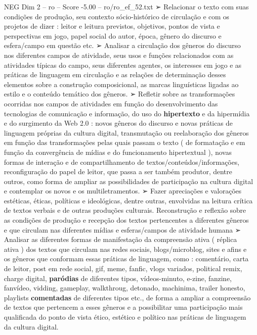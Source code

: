 \begin{textsample}{NEG Dim 2 – ro – Score -5.00 – ro/ro\_ef\_52.txt}  \label{ex:f2_neg_103}
{\EmojiFont ➢} Relacionar o texto com suas condições de produção, seu contexto sócio-histórico de circulação e com os projetos de dizer : leitor e leitura previstos, objetivos, pontos de vista e perspectivas em jogo, papel social do autor, época, gênero do discurso e esfera/campo em questão etc. {\EmojiFont ➢} Analisar a circulação dos gêneros do discurso nos diferentes campos de atividade, seus usos e funções relacionados com as atividades típicas do campo, seus diferentes agentes, os interesses em jogo e as práticas de linguagem em circulação e as relações de determinação desses elementos sobre a construção composicional, as marcas linguísticas ligadas ao estilo e o conteúdo temático dos gêneros. {\EmojiFont ➢} Refletir sobre as transformações ocorridas nos campos de atividades em função do desenvolvimento das tecnologias de comunicação e informação, do uso do \textbf{hipertexto} e da hipermídia e do surgimento da Web 2.0 : novos gêneros do discurso e novas práticas de linguagem próprias da cultura digital, transmutação ou reelaboração dos gêneros em função das transformações pelas quais passam o texto ( de formatação e em função da convergência de mídias e do funcionamento hipertextual ), novas formas de interação e de compartilhamento de textos/conteúdos/informações, reconfiguração do papel de leitor, que passa a ser também produtor, dentre outros, como forma de ampliar as possibilidades de participação na cultura digital e contemplar os novos e os multiletramentos. {\EmojiFont ➢} Fazer apreciações e valorações estéticas, éticas, políticas e ideológicas, dentre outras, envolvidas na leitura crítica de textos verbais e de outras produções culturais.
Reconstrução e reflexão sobre as condições de produção e recepção dos textos pertencentes a diferentes gêneros e que circulam nas diferentes mídias e esferas/campos de atividade humana {\EmojiFont ➢} Analisar as diferentes formas de manifestação da compreensão ativa ( réplica ativa ) dos textos que circulam nas redes sociais, blogs/microblog, sites e afins e os gêneros que conformam essas práticas de linguagem, como : comentário, carta de leitor, post em rede social, gif, meme, fanfic, vlogs variados, political remix, charge digital, \textbf{paródias} de diferentes tipos, vídeos-minuto, e-zine, fanzine, fanvídeo, vidding, gameplay, walkthroug, detonado, machinima, trailer honesto, playlists \textbf{comentadas} de diferentes tipos etc., de forma a ampliar a compreensão de textos que pertencem a esses gêneros e a possibilitar uma participação mais qualificada do ponto de vista ético, estético e político nas práticas de linguagem da cultura digital.

\end{textsample}
